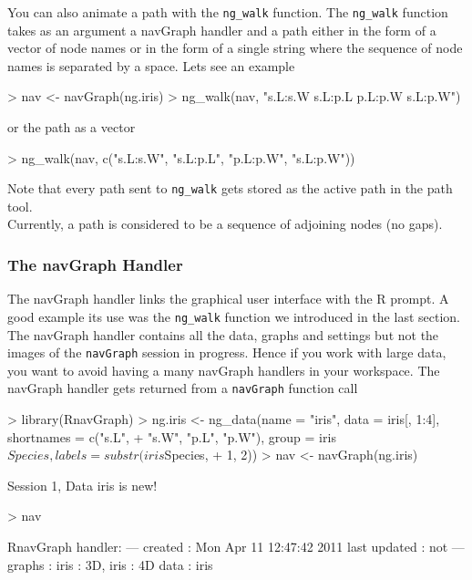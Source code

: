 \documentclass[12pt,oneside,titlepage,letter]{article}
\newcommand{\modify}[1]{{\color{blue}#1}}
\begin{document}
You can also animate a path with the \texttt{ng\_walk} function. The \texttt{ng\_walk} function takes as an argument a navGraph handler and a path either in the form of a vector of node names or in the form of a single string where the sequence of node names is separated by a space. Lets see an example

\begin{Schunk}
\begin{Sinput}
> nav <- navGraph(ng.iris)
> ng_walk(nav, "s.L:s.W s.L:p.L p.L:p.W s.L:p.W")
\end{Sinput}
\end{Schunk}
or the path as a vector
\begin{Schunk}
\begin{Sinput}
> ng_walk(nav, c("s.L:s.W", "s.L:p.L", "p.L:p.W", "s.L:p.W"))
\end{Sinput}
\end{Schunk}
Note that every path sent to \texttt{ng\_walk} gets stored as the active path in the path tool.\\

\modify{Currently, a path is considered to be a sequence of adjoining nodes (no gaps).}

\subsubsection{The navGraph Handler}
The navGraph handler links the graphical user interface with the R prompt. A good example its use was the \texttt{ng\_walk} function we introduced in the last section. The navGraph handler contains all the data, graphs and settings \modify{but not the images} of the \texttt{navGraph} session in progress. Hence if you work with large data, you want to avoid having a many navGraph handlers in your workspace. The navGraph handler gets returned from a \texttt{navGraph} function call
\begin{Schunk}
\begin{Sinput}
> library(RnavGraph)
> ng.iris <- ng_data(name = "iris", data = iris[, 1:4], shortnames = c("s.L", 
+     "s.W", "p.L", "p.W"), group = iris$Species, labels = substr(iris$Species, 
+     1, 2))
> nav <- navGraph(ng.iris)
\end{Sinput}
\begin{Soutput}
Session 1, Data iris is new!
\end{Soutput}
\begin{Sinput}
> nav
\end{Sinput}
\begin{Soutput}
RnavGraph handler:
---
created       : Mon Apr 11 12:47:42 2011 
last updated  : not 
---
graphs        : iris : 3D, iris : 4D 
data          : iris 
\end{Soutput}
\end{Schunk}
\end{document}
